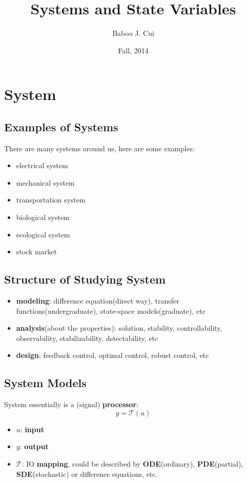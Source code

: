 \documentclass[10pt,a4paper,oneside]{article}
\author{Baboo J. Cui}
\title{Systems and State Variables}
\date{Fall, 2014}
\begin{document}
\maketitle
\tableofcontents

\newcommand{\product}{$\displaystyle \times$}
\newcommand{\delay}{\large$z^{-1}$}

\newpage

\section{System}

\subsection{Examples of Systems}
There are many systems around us, here are some examples:
\begin{itemize}
	\item electrical system
	\item mechanical system
	\item transportation system
	\item biological system
	\item ecological system
	\item stock market
\end{itemize}

\subsection{Structure of Studying System}
\begin{itemize}
	\item \textbf{modeling}: difference equation(direct way), transfer functions(undergraduate), state-space models(graduate), etc
	\item \textbf{analysis}(about the properties): solution, stability, controllability, observability, stabilizability, detectability, etc
	\item \textbf{design}: feedback control, optimal control, robust control, etc
\end{itemize}

\subsection{System Models}
System essentially is a (signal) \textbf{processor}:
\[
y = \mathcal{T}(u)
\]
\begin{itemize}
	\item $u$: \textbf{input}
	\item $y$: \textbf{output}
	\item $\mathcal{T}$: IO \textbf{mapping}, could be described by \textbf{ODE}(ordinary), \textbf{PDE}(partial), \textbf{SDE}(stochastic) or difference equations, etc.
\end{itemize}
\end{document}

